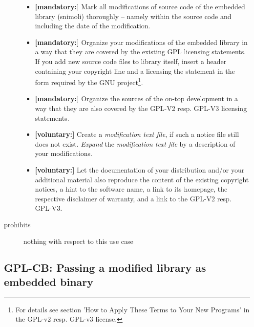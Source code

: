 \begin{description}
\begin{itemize}
  \item \textbf{[mandatory:]} Mark all modifications of source code of the
  embedded library (snimoli) thoroughly -- namely within the source code and
  including the date of the modification.
  
  \item \textbf{[mandatory:]} Organize your modifications of the embedded
  library in a way that they are covered by the existing GPL licensing
  statements. If you add new source code files to library itself, insert a
  header containing your copyright line and a licensing the statement in the
  form required by the GNU project\footnote{For details see section 'How to
  Apply These Terms to Your New Programs' in the GPL-v2 resp. GPL-v3 license.}.
  
  \item \textbf{[mandatory:]} Organize the sources of the on-top development in
  a way that they are also covered by the GPL-V2 resp. GPL-V3 licensing
  statements.
     
  \item \textbf{[voluntary:]} Create a \emph{modification text file}, if such a
  notice file still does not exist. \emph{Expand} the \emph{modification text
  file} by a description of your modifications.
  
  \item \textbf{[voluntary:]} Let the documentation of your distribution and/or
  your additional material also reproduce the content of the existing
  copyright notices, a hint to the software name, a link to its homepage,
  the respective disclaimer of warranty, and a link to the GPL-V2 resp.
  GPL-V3.
  
\end{itemize}

\item[prohibits] nothing with respect to this use case

\end{description}

\subsection{GPL-CB: Passing a modified library as embedded binary}
\label{OSUC-10B-GPL}

